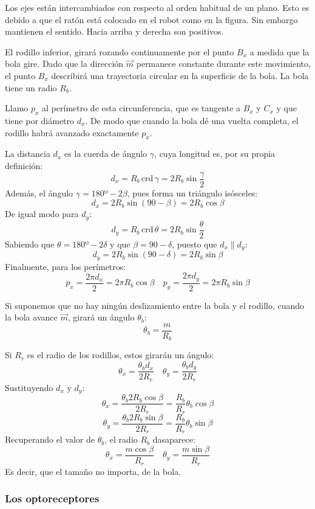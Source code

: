 \documentclass[10pt,a4paper,hidelinks]{article}
\begin{document}
\begin{multicols}{2}
Los ejes están intercambiados con respecto al orden habitual de un plano. Esto 
es debido a que el ratón está colocado en el robot como en la figura. Sin 
embargo mantienen el sentido. Hacia arriba y derecha son positivos.

El rodillo inferior, girará rozando continuamente por el punto $B_x$ a medida 
que la bola gire. Dado que la dirección $\vec{m}$ permanece constante durante 
este movimiento, el punto $B_x$ describirá una trayectoria circular en la 
superficie de la bola. La bola tiene un radio $R_b$.

Llamo $p_x$ al perímetro de esta circunferencia, que es tangente a $B_x$ y $C_x$ 
y que tiene por diámetro $d_x$. De modo que cuando la bola dé una vuelta 
completa, el rodillo habrá avanzado exactamente $p_x$.

La distancia $d_x$ es la cuerda de ángulo $\gamma$, cuya longitud es, por su 
propia definición:
$$ d_x = R_b \, \text{crd} \, \gamma = 2R_b \sin \frac{\gamma}{2}$$
Además, el ángulo $\gamma = 180º - 2\beta$, pues forma un triángulo isósceles:
$$ d_x = 2R_b \sin(90-\beta) = 2R_b\cos \beta$$
De igual modo para $d_y$:
$$ d_y = R_b \, \text{crd} \, \theta = 2R_b \sin \frac{\theta}{2} $$
Sabiendo que $\theta = 180º - 2\delta$ y que $\beta = 90 - \delta$, puesto que 
$d_x \parallel d_y$:
$$ d_y = 2R_b \sin (90 - \delta) = 2R_b \sin \beta $$
Finalmente, para los perímetros:
$$ p_x = \frac{2\pi d_x}{2} = 2 \pi R_b\cos \beta \quad  p_y = \frac{2\pi 
d_y}{2} = 2 \pi R_b\sin \beta $$

Si suponemos que no hay ningún deslizamiento entre la bola y el rodillo, cuando 
la bola avance $\vec{m}$, girará un ángulo $\theta_b$:
$$ \theta_b = \frac{m}{R_b} $$

Si $R_r$ es el radio de los rodillos, estos girarán un ángulo:
$$ \theta_x = \frac{\theta_b d_x}{2R_r} \quad
	\theta_y = \frac{\theta_b d_y}{2R_r}$$
Sustituyendo $d_x$ y $d_y$:
$$ \theta_x = \frac{\theta_b 2R_b\cos \beta}{2R_r} =
	\frac{R_b}{R_r}\theta_b\cos \beta$$
$$ \theta_y = \frac{\theta_b 2R_b\sin \beta}{2R_r} =
	\frac{R_b}{R_r}\theta_b\sin \beta$$
Recuperando el valor de $\theta_b$, el radio $R_b$ dasaparece:
$$ \theta_x = \frac{m \cos \beta}{R_r} \quad
\theta_y = \frac{m \sin \beta}{R_r} $$
Es decir, que el tamaño no importa, de la bola.

\subsubsection{Los optoreceptores}


\end{multicols}
\end{document}
